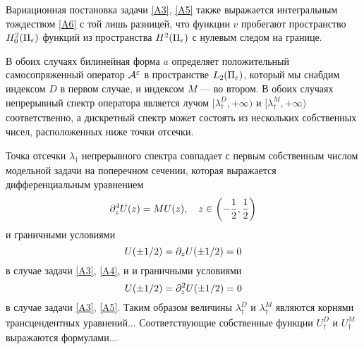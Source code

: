 Вариационная постановка задачи \eqref{A3}, \eqref{A5} также выражается интегральным тождеством \eqref{A6} с той лишь разницей, что функции $v$ пробегают пространство $H^2_0(\Pi_\varepsilon)$ функций из пространства $H^2(\Pi_\varepsilon)$ с нулевым следом на границе.

В обоих случаях билинейная форма $a$ определяет положительный самосопряженный оператор ${\mathcal A}^\varepsilon$ в пространстве $L_2(\Pi_\varepsilon)$, который мы снабдим индексом $D$ в первом случае, и индексом $M$ --- во втором. В обоих случаях непрерывный спектр оператора является лучом $[\lambda_\dagger^D,+\infty)$
и $[\lambda_\dagger^M,+\infty)$ соответственно, а дискретный спектр может состоять из нескольких собственных чисел, расположенных ниже точки отсечки.

Точка отсечки $\lambda_\dagger$ непрерывного спектра совпадает с первым собственным числом модельной задачи на поперечном сечении, которая выражается дифференциальным уравнением 
$$
\partial_z^4 U(z)= M U(z), \quad z\in \left(-\frac{1}{2},\frac{1}{2}\right)
$$
и граничными условиями
$$
U(\pm 1/2)=\partial_z U(\pm 1/2)=0
$$
в случае задачи \eqref{A3}, \eqref{A4}, и
и граничными условиями
$$
U(\pm 1/2)=\partial_z ^2U(\pm 1/2)=0
$$
в случае задачи \eqref{A3}, \eqref{A5}. Таким образом величины $\lambda_\dagger^D$ и $\lambda_\dagger^M$ являются корнями трансцендентных уравнений... Соответствующие собственные функции $U_\dagger^D$ и $U_\dagger^M$ выражаются формулами... 



